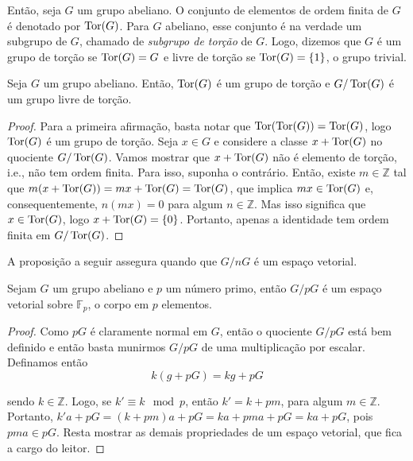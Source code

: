    	\par\vspace{0.3cm} Então, seja $G$ um grupo abeliano. O conjunto de elementos de ordem finita de 
    	$G$ é denotado por $\operatorname{Tor}(G)$. Para $G$ abeliano, esse conjunto é na verdade um subgrupo de $G$, 
    	chamado de \textit{subgrupo de torção} de $G$. Logo, dizemos que $G$ é um grupo de torção se 
    	$\operatorname{Tor}(G) = G$ e livre de torção se $\operatorname{Tor}(G) = \left\{1\right\}$, o grupo trivial.
    	\begin{lemma}
    	\label{quociente por tor}
    		Seja $G$ um grupo abeliano. Então, $\operatorname{Tor}(G)$ é um grupo de torção e $G/\operatorname{Tor}(G)$ é um 
    		grupo livre de torção.
    	\end{lemma}
    	\begin{proof}
    		Para a primeira afirmação, basta notar que $\operatorname{Tor}(\operatorname{Tor}(G)) = \operatorname{Tor}(G)$, logo $\operatorname{Tor}(G)$ é um grupo 
    		de torção. Seja $x\in G$ e considere a classe $x + \operatorname{Tor}(G)$ no quociente $G/\operatorname{Tor}(G)$. Vamos mostrar
    		que $x + \operatorname{Tor}(G)$ não é elemento de torção, i.e., não tem ordem finita. Para isso, suponha o
    		contrário. Então, existe $m\in\mathbb{Z}$ tal que $m( x+\operatorname{Tor}(G) ) = mx + \operatorname{Tor}(G) = \operatorname{Tor}(G)$, que
    		implica $mx\in\operatorname{Tor}(G)$ e, consequentemente, $n(mx) = 0$ para algum $n\in\mathbb{Z}$. Mas isso
    		significa que $x\in\operatorname{Tor}(G)$, logo $x+\operatorname{Tor}(G) = \left\{0\right\}$. Portanto, apenas a identidade tem
    		ordem finita em $G/\operatorname{Tor}(G)$. 
    	\end{proof}
    	\par\vspace{0.3cm} A proposição a seguir assegura quando que $G/nG$ é um espaço vetorial.
    	\begin{prop}
    	\label{G/nG espaco vetorial}
    		Sejam $G$ um grupo abeliano e $p$ um número primo, então $G/pG$ é um espaço vetorial sobre
    		$\mathbb{F}_p$, o corpo em $p$ elementos.
    	\end{prop}
    	\begin{proof}
    		Como $pG$ é claramente normal em $G$, então o quociente $G/pG$ está bem definido e então basta
    		munirmos $G/pG$ de uma multiplicação por escalar. Definamos então
    		\begin{equation*}
    		    k(g+pG)  = kg + pG
    		\end{equation*}
    		\par\vspace{0.3cm} sendo $k\in\mathbb{Z}$. Logo, se $k'\equiv k\mod p$, então $k' = k + pm$, para
    		algum $m\in\mathbb{Z}$. Portanto, $k'a + pG = (k+pm)a + pG = ka + pma + pG = ka + pG$, pois 
    		$pma\in pG$. Resta mostrar as demais propriedades de um espaço vetorial, que fica a cargo do leitor.
    	\end{proof}
